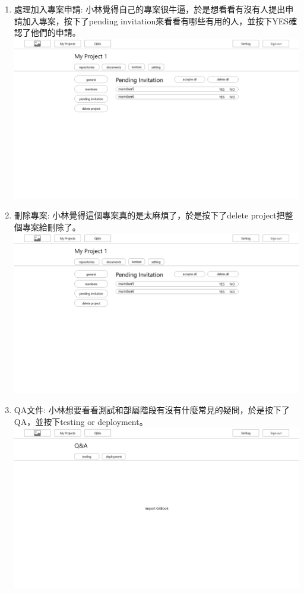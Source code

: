 \documentclass{report}
\begin{document}
\begin{enumerate}[label=(\Alph*)]
  \item 處理加入專案申請: 小林覺得自己的專案很牛逼，於是想看看有沒有人提出申請加入專案，按下了pending invitation來看看有哪些有用的人，並按下YES確認了他們的申請。\\
  \includegraphics[width=\textwidth]{assets/wireframe/My_Projects_setting_pending_invitation.png}
  \item 刪除專案: 小林覺得這個專案真的是太麻煩了，於是按下了delete project把整個專案給刪除了。\\
  \includegraphics[width=\textwidth]{assets/wireframe/My_Projects_setting_pending_invitation.png}
  \item QA文件: 小林想要看看測試和部屬階段有沒有什麼常見的疑問，於是按下了QA，並按下testing or deployment。\\
  \includegraphics[width=\textwidth]{assets/wireframe/QA_testing_deployment.png}

\end{enumerate}
\end{document}
